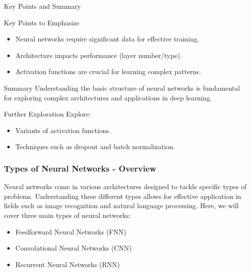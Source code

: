 \documentclass[aspectratio=169]{beamer}
\begin{document}
\begin{frame}[fragile]{Key Points and Summary}
  \begin{block}{Key Points to Emphasize}
    \begin{itemize}
      \item Neural networks require significant data for effective training.
      \item Architecture impacts performance (layer number/type).
      \item Activation functions are crucial for learning complex patterns.
    \end{itemize}
  \end{block}

  \begin{block}{Summary}
    Understanding the basic structure of neural networks is fundamental for exploring complex architectures and applications in deep learning.
  \end{block}

  \begin{block}{Further Exploration}
    Explore: 
    \begin{itemize}
      \item Variants of activation functions.
      \item Techniques such as dropout and batch normalization.
    \end{itemize}
  \end{block}
\end{frame}

\begin{frame}[fragile]
    \frametitle{Types of Neural Networks - Overview}
    Neural networks come in various architectures designed to tackle specific types of problems. Understanding these different types allows for effective application in fields such as image recognition and natural language processing. Here, we will cover three main types of neural networks:
    \begin{itemize}
        \item Feedforward Neural Networks (FNN)
        \item Convolutional Neural Networks (CNN)
        \item Recurrent Neural Networks (RNN)
    \end{itemize}
\end{frame}
\end{document}
